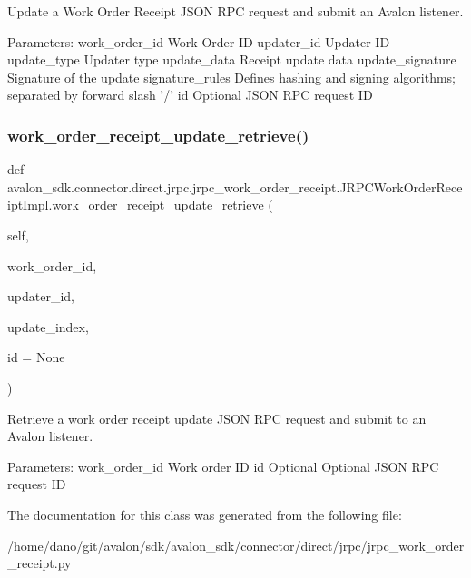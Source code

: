 \begin{DoxyVerb}Update a Work Order Receipt JSON RPC request and submit an
Avalon listener.

Parameters:
work_order_id    Work Order ID
updater_id       Updater ID
update_type      Updater type
update_data      Receipt update data
update_signature Signature of the update
signature_rules  Defines hashing and signing algorithms;
         separated by forward slash '/'
id               Optional JSON RPC request ID
\end{DoxyVerb}
 \mbox{\label{classavalon__sdk_1_1connector_1_1direct_1_1jrpc_1_1jrpc__work__order__receipt_1_1JRPCWorkOrderReceiptImpl_aaab5946fb57879475620ae202d039654}} 
\subsubsection{\texorpdfstring{work\+\_\+order\+\_\+receipt\+\_\+update\+\_\+retrieve()}{work\_order\_receipt\_update\_retrieve()}}
{\footnotesize\ttfamily def avalon\+\_\+sdk.\+connector.\+direct.\+jrpc.\+jrpc\+\_\+work\+\_\+order\+\_\+receipt.\+J\+R\+P\+C\+Work\+Order\+Receipt\+Impl.\+work\+\_\+order\+\_\+receipt\+\_\+update\+\_\+retrieve (\begin{DoxyParamCaption}\item[{}]{self,  }\item[{}]{work\+\_\+order\+\_\+id,  }\item[{}]{updater\+\_\+id,  }\item[{}]{update\+\_\+index,  }\item[{}]{id = {\ttfamily None} }\end{DoxyParamCaption})}

\begin{DoxyVerb}Retrieve a work order receipt update JSON RPC request and submit to an
Avalon listener.

Parameters:
work_order_id Work order ID
id            Optional Optional JSON RPC request ID
\end{DoxyVerb}
 

The documentation for this class was generated from the following file\+:\begin{DoxyCompactItemize}
\item 
/home/dano/git/avalon/sdk/avalon\+\_\+sdk/connector/direct/jrpc/jrpc\+\_\+work\+\_\+order\+\_\+receipt.\+py\end{DoxyCompactItemize}
